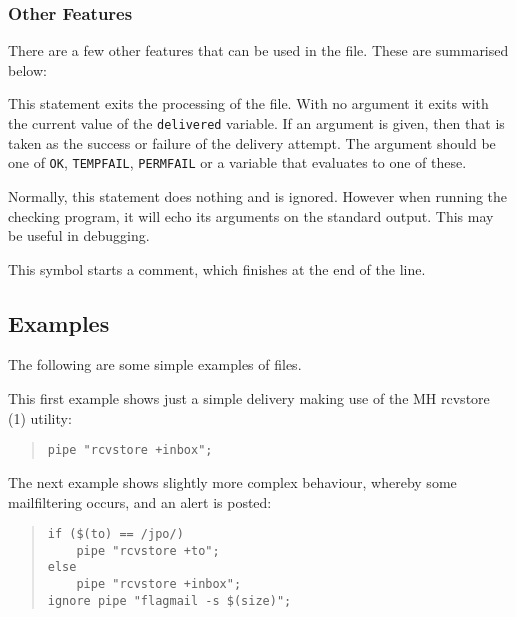 \subsubsection{Other Features}

There are a few other features that can be used in the
 file. These are summarised below:

\begin{describe}
\item[\verb|exit|:]	This statement exits the
processing of the  file. With no argument it exits
with the current value of the \verb|delivered| variable. If an
argument is given, then that is taken as the success or failure of the
\linebreak[3]delivery attempt. The argument should be one of \verb|OK|,
\verb|TEMPFAIL|, \verb|PERMFAIL| or a variable that evaluates to one
of these.

\item[\verb|print|:]	Normally, this statement does nothing
and is ignored. However when running the checking program, it
will echo its arguments on the standard output. This may be useful in
debugging.

\item[\verb|\#|:]	This\index{\#} symbol starts a
comment, which finishes at the end of the line.

\end{describe}

\subsection{Examples}

The following are some simple examples of  files.

This first example shows just a simple delivery making use of the MH
\man rcvstore (1) utility:

\begin{quote}\small\begin{verbatim}
pipe "rcvstore +inbox";
\end{verbatim}\end{quote}

The next example shows slightly more complex behaviour, whereby some
mailfiltering occurs, and an alert is posted:
\begin{quote}\small\begin{verbatim}
if ($(to) == /jpo/)
	pipe "rcvstore +to";
else
	pipe "rcvstore +inbox";
ignore pipe "flagmail -s $(size)";
\end{verbatim}\end{quote}

